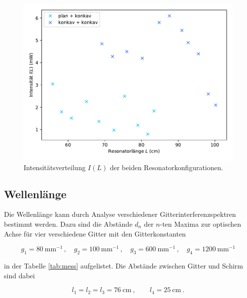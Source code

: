 \begin{figure}[H]
    \centering
    \includegraphics[scale=0.65]{content/gg.pdf}
    \vspace{-10pt}
    \caption{Intensitätsverteilung $I(L)$ der beiden Resonatorkonfigurationen.}
    \label{fig:gg}
\end{figure}



\subsection{Wellenlänge}

Die Wellenlänge kann durch Analyse verschiedener Gitterinterferenzspektren bestimmt werden.
Dazu sind die Abstände $d_n$ der $n$-ten Maxima zur optischen Achse für vier verschiedene
Gitter mit den Gitterkonstanten 

\vspace{-5pt}
\begin{equation*}
    g_1 = \SI{80}{\milli\meter\tothe{-1}} \, , \quad g_2 = \SI{100}{\milli\meter\tothe{-1}} \, , \quad 
    g_3 = \SI{600}{\milli\meter\tothe{-1}} \, , \quad g_4 = \SI{1200}{\milli\meter\tothe{-1}}
\end{equation*}

in der Tabelle \ref{tab:mess} aufgelistet. Die Abstände zwischen Gitter und Schirm sind dabei

\vspace{-5pt}
\begin{equation*}
    l_1=l_2=l_3 = \SI{76}{\centi\meter}\: , \qquad l_4 = \SI{25}{\centi\meter}\: .
\end{equation*}

